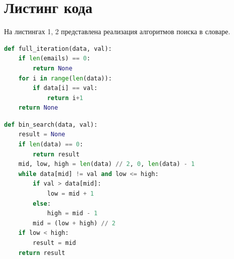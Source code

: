 \documentclass[a4paper, 12pt]{article}
\begin{document}
 


\section{Листинг кода}

	На листингах 1, 2 представлена реализация алгоритмов поиска в словаре.


	\lstset{style=mystyle}

	\begin{lstlisting}[language=Python, caption = Алгоритм полного перебора]
def full_iteration(data, val):
	if len(emails) == 0:
		return None
	for i in range(len(data)):
		if data[i] == val:
			return i+1
	return None
	\end{lstlisting}
\begin{lstlisting}[language=Python, caption = Алгоритм бинарного поиска]
def bin_search(data, val):
	result = None
	if len(data) == 0:
		return result
	mid, low, high = len(data) // 2, 0, len(data) - 1
	while data[mid] != val and low <= high:
		if val > data[mid]:
			low = mid + 1
		else:
			high = mid - 1
		mid = (low + high) // 2
	if low < high:
		result = mid 
	return result
\end{lstlisting}
\end{document}
